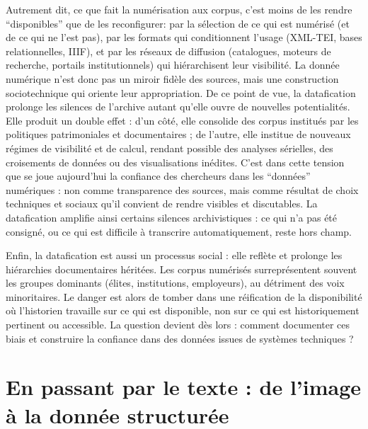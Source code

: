Autrement dit, ce que fait la numérisation aux corpus, c’est moins de les rendre \enquote{disponibles} que de les reconfigurer: par la sélection de ce qui est numérisé (et de ce qui ne l’est pas), par les formats qui conditionnent l’usage (XML-TEI, bases relationnelles, IIIF), et par les réseaux de diffusion (catalogues, moteurs de recherche, portails institutionnels) qui hiérarchisent leur visibilité. La donnée numérique n’est donc pas un miroir fidèle des sources, mais une construction sociotechnique qui oriente leur appropriation. De ce point de vue, la datafication prolonge les silences de l’archive autant qu’elle ouvre de nouvelles potentialités. Elle produit un double effet : d’un côté, elle consolide des corpus institués par les politiques patrimoniales et documentaires ; de l’autre, elle institue de nouveaux régimes de visibilité et de calcul, rendant possible des analyses sérielles, des croisements de données ou des visualisations inédites. C’est dans cette tension que se joue aujourd’hui la confiance des chercheurs dans les \enquote{données} numériques : non comme transparence des sources, mais comme résultat de choix techniques et sociaux qu’il convient de rendre visibles et discutables. La datafication amplifie ainsi certains silences archivistiques : ce qui n’a pas été consigné, ou ce qui est difficile à transcrire automatiquement, reste hors champ.

Enfin, la datafication est aussi un processus social : elle reflète et prolonge les hiérarchies documentaires héritées. Les corpus numérisés surreprésentent souvent les groupes dominants (élites, institutions, employeurs), au détriment des voix minoritaires. Le danger est alors de tomber dans une réification de la disponibilité où l’historien travaille sur ce qui est disponible, non sur ce qui est historiquement pertinent ou accessible. La question devient dès lors : comment documenter ces biais et construire la confiance dans des données issues de systèmes techniques ? 

\chapter{En passant par le texte : de l'image à la donnée structurée}

